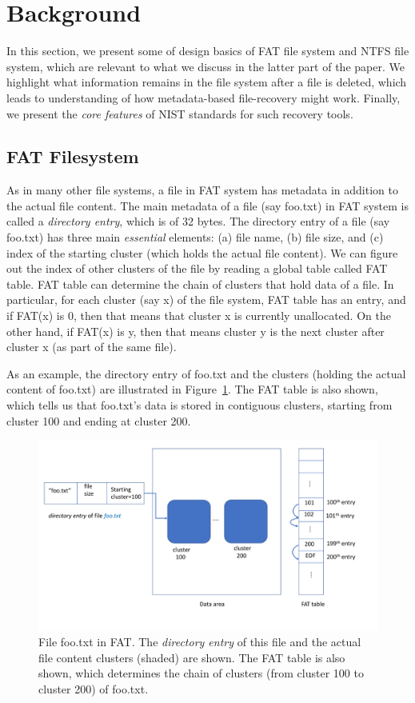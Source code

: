 \section{Background}

In this section, we present some of design basics of FAT file system and NTFS file system, 
which are relevant to what we discuss in the latter part of the paper. 
We highlight what information remains in the file system after a file is deleted, 
which leads to understanding of how metadata-based file-recovery might work. 
Finally, we present the \emph{core features} of NIST standards for such recovery tools.  

\subsection{FAT Filesystem}
As in many other file systems, a file in FAT system has metadata in addition to the actual file content. 
The main metadata of a file (say foo.txt) in FAT system is called a \emph{directory entry}, which is of 32 bytes.
The directory entry of a file (say foo.txt) has three main \emph{essential} elements: (a) file name, (b) file size, and 
(c) index of the starting cluster (which holds the actual file content). We can figure 
out the index of other clusters of the file by reading a global table called FAT table. FAT table
can determine the chain of clusters that hold data of a file. In particular, 
for each cluster (say x) of the file system, FAT table has an entry, and 
if FAT(x) is 0, then that means that cluster x is currently unallocated. 
On the other hand, if FAT(x) is y, then that means cluster y is the next cluster after cluster x (as part of the same file). 
   
As an example, the directory entry of foo.txt and the clusters (holding the actual content of foo.txt) 
are illustrated in Figure~\ref{fig:fat1}. The FAT table is also shown, which tells us that foo.txt's data is stored 
in contiguous clusters, starting from cluster 100 and ending at cluster 200.

\begin{figure}[h]
    \centering
    \includegraphics[width=\linewidth]{fig/fat1.pdf}
    \caption{File foo.txt in FAT. The \emph{directory entry} of this file and the actual file content clusters (shaded) are shown. 
The FAT table is also shown, which determines the chain of clusters (from cluster 100 to cluster 200) of foo.txt.}
    \label{fig:fat1}
\end{figure}


